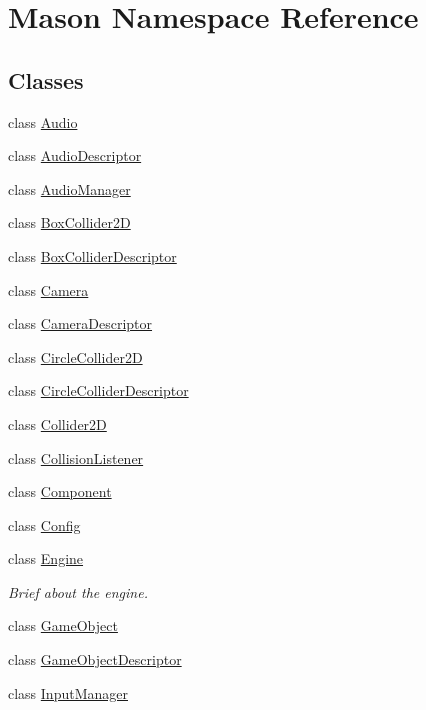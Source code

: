 \hypertarget{namespace_mason}{}\section{Mason Namespace Reference}
\label{namespace_mason}
\subsection*{Classes}
\begin{DoxyCompactItemize}
\item 
class \hyperlink{class_mason_1_1_audio}{Audio}
\item 
class \hyperlink{class_mason_1_1_audio_descriptor}{Audio\+Descriptor}
\item 
class \hyperlink{class_mason_1_1_audio_manager}{Audio\+Manager}
\item 
class \hyperlink{class_mason_1_1_box_collider2_d}{Box\+Collider2D}
\item 
class \hyperlink{class_mason_1_1_box_collider_descriptor}{Box\+Collider\+Descriptor}
\item 
class \hyperlink{class_mason_1_1_camera}{Camera}
\item 
class \hyperlink{class_mason_1_1_camera_descriptor}{Camera\+Descriptor}
\item 
class \hyperlink{class_mason_1_1_circle_collider2_d}{Circle\+Collider2D}
\item 
class \hyperlink{class_mason_1_1_circle_collider_descriptor}{Circle\+Collider\+Descriptor}
\item 
class \hyperlink{class_mason_1_1_collider2_d}{Collider2D}
\item 
class \hyperlink{class_mason_1_1_collision_listener}{Collision\+Listener}
\item 
class \hyperlink{class_mason_1_1_component}{Component}
\item 
class \hyperlink{class_mason_1_1_config}{Config}
\item 
class \hyperlink{class_mason_1_1_engine}{Engine}
\begin{DoxyCompactList}\small\item\em Brief about the engine. \end{DoxyCompactList}\item 
class \hyperlink{class_mason_1_1_game_object}{Game\+Object}
\item 
class \hyperlink{class_mason_1_1_game_object_descriptor}{Game\+Object\+Descriptor}
\item 
class \hyperlink{class_mason_1_1_input_manager}{Input\+Manager}

\end{DoxyCompactItemize}
